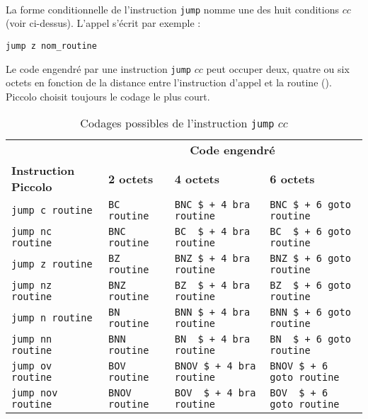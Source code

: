 ~\\
La forme conditionnelle de l'instruction \texttt{jump} nomme une des huit conditions $cc$ (voir ci-dessus). L'appel s'écrit par exemple :
\begin{lstlisting}[language=piccolo]
jump z nom_routine
\end{lstlisting}

Le code engendré par une instruction \texttt{jump} $cc$ peut occuper deux, quatre ou six octets en fonction de la distance entre l'instruction d'appel et la routine (). Piccolo choisit toujours le codage le plus court. 



\begin{table}[!ht]
  \centering
  \small
  \begin{tabular}{llp{2.5cm}p{2.5cm}}
      & \multicolumn{3}{c}{\bf Code engendré}\\
    \textbf{Instruction Piccolo} & \textbf{2 octets} & \textbf{4 octets} & \textbf{6 octets}\\
    \hline
    \texttt{jump c routine} & \texttt{BC routine} & \texttt{BNC \$ + 4 bra routine} & \texttt{BNC \$ + 6 goto routine}\\
    \texttt{jump nc routine} & \texttt{BNC routine} & \texttt{BC ~\$ + 4 bra routine} & \texttt{BC ~\$ + 6 goto routine}\\
    \texttt{jump z routine} & \texttt{BZ routine} & \texttt{BNZ \$ + 4 bra routine} & \texttt{BNZ \$ + 6 goto routine}\\
    \texttt{jump nz routine} & \texttt{BNZ routine} & \texttt{BZ ~\$ + 4 bra routine} & \texttt{BZ ~\$ + 6 goto routine}\\
    \texttt{jump n routine} & \texttt{BN routine} & \texttt{BNN \$ + 4 bra routine} & \texttt{BNN \$ + 6 goto routine}\\
    \texttt{jump nn routine} & \texttt{BNN routine} & \texttt{BN ~\$ + 4 bra routine} & \texttt{BN ~\$ + 6 goto routine}\\
    \texttt{jump ov routine} & \texttt{BOV routine} & \texttt{BNOV \$ + 4 bra routine} & \texttt{BNOV \$ + 6 goto routine}\\
    \texttt{jump nov routine} & \texttt{BNOV routine} & \texttt{BOV ~\$ + 4 bra routine} & \texttt{BOV ~\$ + 6 goto routine}\\
    \hline
  \end{tabular}
  \caption{Codages possibles de l'instruction \texttt{jump} $cc$}
\end{table}


